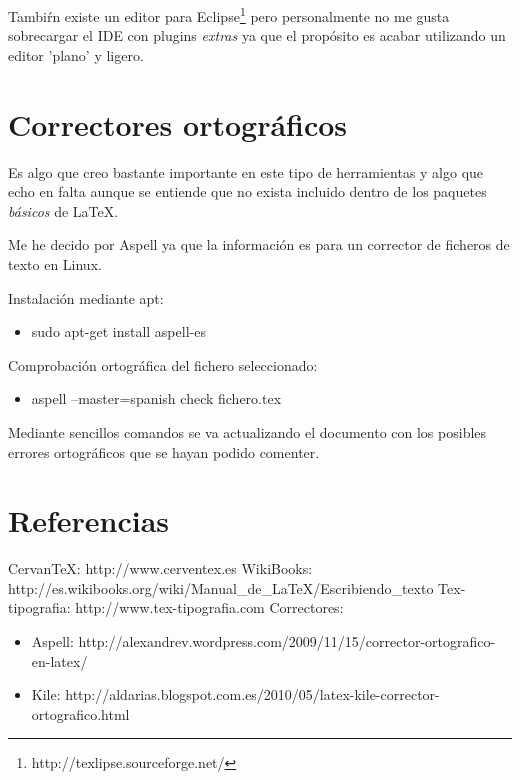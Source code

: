 \documentclass[11pt]{article}
\begin{document}
Tambi\'rn existe un editor para Eclipse\footnote{http://texlipse.sourceforge.net/} pero personalmente no me gusta sobrecargar el IDE con plugins \emph{extras} ya que el prop\'osito es acabar utilizando un editor 'plano' y ligero.

\section{Correctores ortogr\'aficos}

Es algo que creo bastante importante en este tipo de herramientas y algo que echo en falta aunque se entiende que no exista incluido dentro de los paquetes \emph{b\'asicos} de \LaTeX{}.

Me he decido por Aspell ya que la informaci\'on es para un corrector de ficheros de texto en Linux.

Instalaci\'on mediante apt: 
\begin{itemize}
	\item sudo apt-get install aspell-es
\end{itemize}
Comprobaci\'on ortogr\'afica del fichero seleccionado:
\begin{itemize}
	\item aspell –master=spanish  check fichero.tex
\end{itemize}

Mediante sencillos comandos se va actualizando el documento con los posibles errores ortogr\'aficos que se hayan podido comenter.

\section{Referencias}

CervanTeX: http://www.cerventex.es
WikiBooks: http://es.wikibooks.org/wiki/Manual\_de\_LaTeX/Escribiendo\_texto
Tex-tipografia: http://www.tex-tipografia.com 
Correctores:

\begin{itemize}
	\item Aspell: http://alexandrev.wordpress.com/2009/11/15/corrector-ortografico-en-latex/
	\item Kile: http://aldarias.blogspot.com.es/2010/05/latex-kile-corrector-ortografico.html
\end{itemize}
\end{document}
